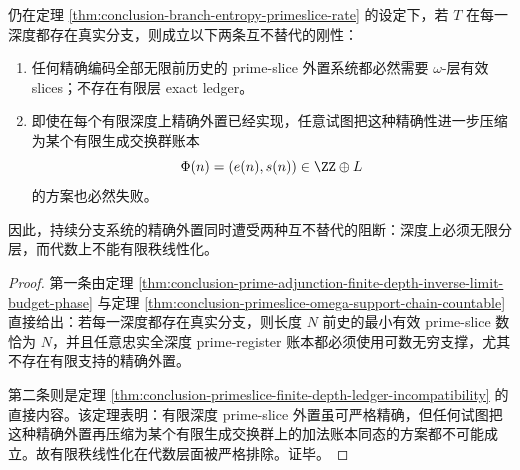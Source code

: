 \begin{theorem}\label{thm:conclusion-omega-support-finite-rank-double-obstruction}
仍在定理 \ref{thm:conclusion-branch-entropy-primeslice-rate} 的设定下，若 \(T\) 在每一深度都存在真实分支，则成立以下两条互不替代的刚性：
\begin{enumerate}
  \item 任何精确编码全部无限前历史的 prime-slice 外置系统都必然需要 \(\omega\)-层有效 slices；不存在有限层 exact ledger。

  \item 即使在每个有限深度上精确外置已经实现，任意试图把这种精确性进一步压缩为某个有限生成交换群账本
  \[
  \Phi(n)=(e(n),s(n))\in \ZZ\oplus L
  \]
  的方案也必然失败。
\end{enumerate}
因此，持续分支系统的精确外置同时遭受两种互不替代的阻断：深度上必须无限分层，而代数上不能有限秩线性化。
\end{theorem}
\begin{proof}
第一条由定理 \ref{thm:conclusion-prime-adjunction-finite-depth-inverse-limit-budget-phase} 与定理 \ref{thm:conclusion-primeslice-omega-support-chain-countable} 直接给出：若每一深度都存在真实分支，则长度 \(N\) 前史的最小有效 prime-slice 数恰为 \(N\)，并且任意忠实全深度 prime-register 账本都必须使用可数无穷支撑，尤其不存在有限支持的精确外置。

第二条则是定理 \ref{thm:conclusion-primeslice-finite-depth-ledger-incompatibility} 的直接内容。该定理表明：有限深度 prime-slice 外置虽可严格精确，但任何试图把这种精确外置再压缩为某个有限生成交换群上的加法账本同态的方案都不可能成立。故有限秩线性化在代数层面被严格排除。证毕。
\end{proof}

